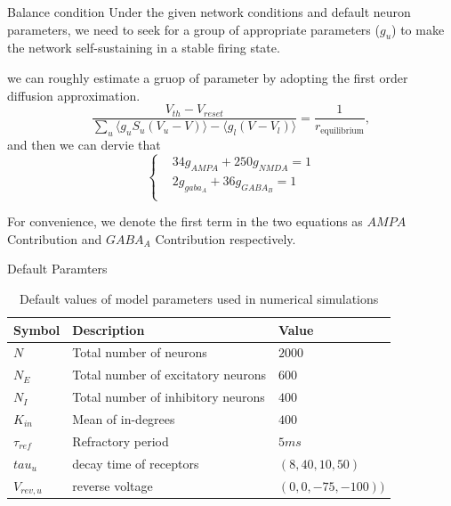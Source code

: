 \documentclass{beamer}
\begin{document}
\begin{frame}{Balance condition}
	Under the given network conditions and default neuron parameters, we need to seek for a group of appropriate parameters ($ g_{u} $) to make the network self-sustaining in a stable firing state.
	
	\par 
	we can roughly estimate a gruop of parameter by adopting the first order diffusion approximation.
	\begin{equation*}
		\dfrac{V_{th} - V_{reset}}{\sum_{u} \langle g_{u}S_{u}(V_u - V) \rangle - \langle g_{l}(V - V_{l})\rangle} = \dfrac{1 }{r_{\text{equilibrium}}},
	\end{equation*}	
	and then we can dervie that
	\begin{equation*}
		\left\{
		\begin{aligned}
			&34 g_{AMPA} + 250 g_{NMDA} = 1 \\
			&2 g_{gaba_{A}} + 36 g_{GABA_{B}} = 1\\
		\end{aligned}
		\right .
	\end{equation*}
	\par 
	For convenience, we denote the first term in the two equations as $AMPA$ Contribution and $ GABA_{A} $ Contribution respectively.
	
\end{frame}

\begin{frame}{Default Paramters}
	\begin{table}
		\centering
		\begin{tabular}{lll}
			Symbol & Description & Value\\
			\hline
			$N$ & Total number of neurons & $2000$\\
			$N_{E}$ & Total number of excitatory neurons & $600$ \\
			$N_{I}$ & Total number of inhibitory neurons & $400$ \\
			$K_{in}$ &  Mean of in-degrees & $400$ \\
			$\tau_{ref}$ & Refractory period & $5ms$ \\
			$tau_{u}$ & decay time of receptors & $(8, 40, 10, 50)$ \\
			$V_{rev, u}$ & reverse voltage & $(0, 0, -75, -100))$ \\
		\end{tabular}
		\caption{Default values of model parameters used in numerical simulations}
		\label{tab:model_tabel}
	\end{table}
\end{frame}
\end{document}
